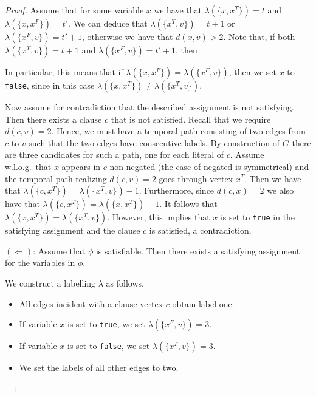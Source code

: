 \documentclass[11pt,a4paper]{article}
\theoremstyle{remark}
\theoremstyle{definition}
\begin{document}
\begin{proof}
Assume that for some variable $x$ we have that $\lambda(\{x,x^T\})=t$ and $\lambda(\{x,x^F\})=t'$. 
We can deduce that $\lambda(\{x^T,v\})=t+1$ or $\lambda(\{x^F,v\})=t'+1$, otherwise we have that $d(x,v)>2$.
Note that, if both $\lambda(\{x^T,v\})=t+1$ and $\lambda(\{x^F,v\})=t'+1$, then 


In particular, this means that if $\lambda(\{x,x^F\})=\lambda(\{x^F,v\})$, then we set $x$ to \texttt{false}, since in this case $\lambda(\{x,x^T\})\neq\lambda(\{x^T,v\})$.


Now assume for contradiction that the described assignment is not satisfying. Then there exists a clause $c$ that is not satisfied. Recall that we require $d(c,v)=2$. Hence, we must have a temporal path consisting of two edges from $c$ to $v$ such that the two edges have consecutive labels. By construction of $G$ there are three candidates for such a path, one for each literal of $c$. Assume w.l.o.g.\ that $x$ appears in $c$ non-negated (the case of negated is symmetrical) and the temporal path realizing $d(c,v)=2$ goes through vertex $x^T$. Then we have that $\lambda(\{c,x^T\})=\lambda(\{x^T,v\})-1$. Furthermore, since $d(c,x)=2$ we also have that $\lambda(\{c,x^T\})=\lambda(\{x,x^T\})-1$. It follows that $\lambda(\{x,x^T\})=\lambda(\{x^T,v\})$. However, this implies that $x$ is set to \texttt{true} in the satisfying assignment and the clause $c$ is satisfied, a contradiction.


$(\Leftarrow)$: Assume that $\phi$ is satisfiable. Then there exists a satisfying assignment for the variables in $\phi$.

We construct a labelling $\lambda$ as follows.
\begin{itemize}
    \item All edges incident with a clause vertex $c$ obtain label one.
    \item If variable $x$ is set to \texttt{true}, we set $\lambda(\{x^F,v\})=3$.
    \item If variable $x$ is set to \texttt{false}, we set $\lambda(\{x^T,v\})=3$.
    \item We set the labels of all other edges to two.
\end{itemize}


\end{proof}
\end{document}
